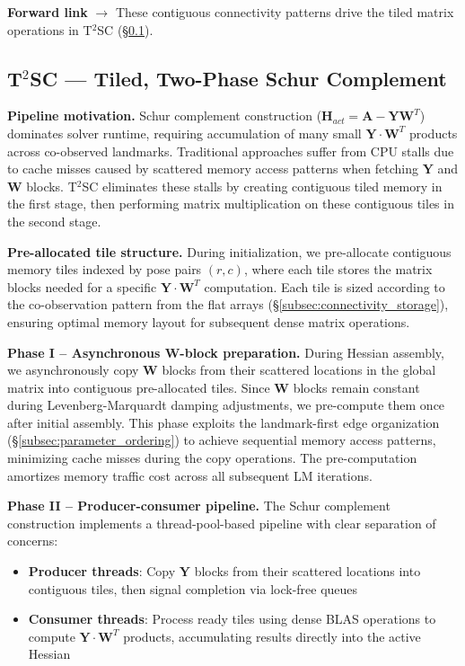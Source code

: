 \textbf{Forward link} $\rightarrow$ These contiguous connectivity patterns drive the tiled matrix 
operations in T$^2$SC (\S\ref{subsec:t2sc}).

\subsection{T$^2$SC --- Tiled, Two-Phase Schur Complement}
\label{subsec:t2sc}

\textbf{Pipeline motivation.} Schur complement construction ($\mathbf{H}_{act} = \mathbf{A} - \mathbf{Y}\mathbf{W}^T$) 
dominates solver runtime, requiring accumulation of many small $\mathbf{Y} \cdot \mathbf{W}^T$ products across co-observed 
landmarks. Traditional approaches suffer from CPU stalls due to cache misses caused by scattered memory access patterns 
when fetching $\mathbf{Y}$ and $\mathbf{W}$ blocks. T$^2$SC eliminates these stalls by creating contiguous tiled memory 
in the first stage, then performing matrix multiplication on these contiguous tiles in the second stage.

\textbf{Pre-allocated tile structure.} During initialization, we pre-allocate 
contiguous memory tiles indexed by pose pairs $(r,c)$, where each tile stores the matrix blocks 
needed for a specific $\mathbf{Y} \cdot \mathbf{W}^T$ computation. Each tile is sized according to the 
co-observation pattern from the flat arrays (§\ref{subsec:connectivity_storage}), ensuring 
optimal memory layout for subsequent dense matrix operations.

\textbf{Phase I -- Asynchronous W-block preparation.} During Hessian assembly, 
we asynchronously copy $\mathbf{W}$ blocks from their scattered locations in the global matrix 
into contiguous pre-allocated tiles. Since $\mathbf{W}$ blocks remain constant during 
Levenberg-Marquardt damping adjustments, we pre-compute them once after initial assembly. 
This phase exploits the landmark-first edge organization (§\ref{subsec:parameter_ordering}) 
to achieve sequential memory access patterns, minimizing cache misses during the copy operations. 
The pre-computation amortizes memory traffic cost across all subsequent LM iterations.

\textbf{Phase II -- Producer-consumer pipeline.} The Schur complement construction 
implements a thread-pool-based pipeline with clear separation of concerns:

\begin{itemize}
\item \textbf{Producer threads}: Copy $\mathbf{Y}$ blocks from their scattered locations into 
contiguous tiles, then signal completion via lock-free queues

\item \textbf{Consumer threads}: Process ready tiles using dense BLAS operations to compute 
$\mathbf{Y} \cdot \mathbf{W}^T$ products, accumulating results directly into the active Hessian
\end{itemize}

